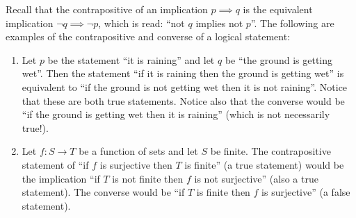 \documentclass[12pt]{article}
\theoremstyle{definition}
\begin{document}
Recall that the contrapositive of an implication $p \implies q$ is the equivalent implication $\neg q \implies \neg p$, which is read: ``not $q$ implies not $p$''. The following are examples of the contrapositive and converse of a logical statement:

\begin{enumerate}
\item Let $p$ be the statement ``it is raining'' and let $q$ be ``the ground is getting wet''. Then the statement ``if it is raining then the ground is getting wet'' is equivalent to ``if the ground is not getting wet then it is not raining''.  Notice that these are both true statements.  Notice also that the converse would be ``if the ground is getting wet then it is raining'' (which is not necessarily true!).

\item Let $f:S\to T$ be a function of sets and let $S$ be finite. The contrapositive statement of ``if $f$ is surjective then $T$ is finite'' (a true statement) would be the implication ``if $T$ is not finite then $f$ is not surjective'' (also a true statement). The converse would be ``if $T$ is finite then $f$ is surjective'' (a false statement).
\end{enumerate}
\end{document}
